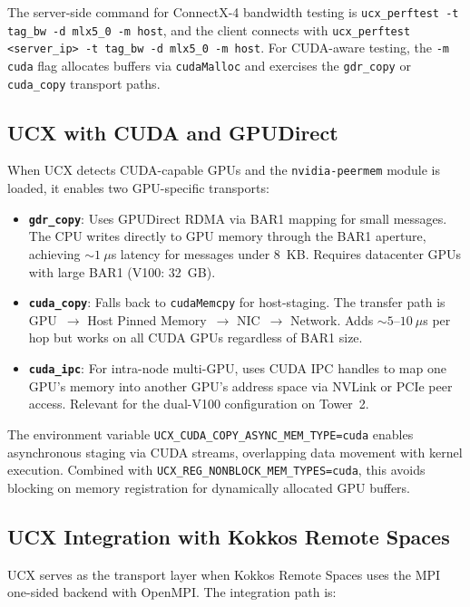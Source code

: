 \documentclass[11pt,letterpaper]{article}
\begin{document}
The server-side command for ConnectX-4 bandwidth testing is \texttt{ucx\_perftest -t tag\_bw -d mlx5\_0 -m host}, and the client connects with \texttt{ucx\_perftest <server\_ip> -t tag\_bw -d mlx5\_0 -m host}. For CUDA-aware testing, the \texttt{-m cuda} flag allocates buffers via \texttt{cudaMalloc} and exercises the \texttt{gdr\_copy} or \texttt{cuda\_copy} transport paths.

\subsection{UCX with CUDA and GPUDirect}

When UCX detects CUDA-capable GPUs and the \texttt{nvidia-peermem} module is loaded, it enables two GPU-specific transports:

\begin{itemize}[noitemsep]
    \item \textbf{\texttt{gdr\_copy}}: Uses GPUDirect RDMA via BAR1 mapping for small messages. The CPU writes directly to GPU memory through the BAR1 aperture, achieving ${\sim}1~\mu$s latency for messages under 8~KB. Requires datacenter GPUs with large BAR1 (V100: 32~GB).
    \item \textbf{\texttt{cuda\_copy}}: Falls back to \texttt{cudaMemcpy} for host-staging. The transfer path is GPU~$\to$ Host Pinned Memory~$\to$ NIC~$\to$ Network. Adds ${\sim}5$--$10~\mu$s per hop but works on all CUDA GPUs regardless of BAR1 size.
    \item \textbf{\texttt{cuda\_ipc}}: For intra-node multi-GPU, uses CUDA IPC handles to map one GPU's memory into another GPU's address space via NVLink or PCIe peer access. Relevant for the dual-V100 configuration on Tower~2.
\end{itemize}

The environment variable \texttt{UCX\_CUDA\_COPY\_ASYNC\_MEM\_TYPE=cuda} enables asynchronous staging via CUDA streams, overlapping data movement with kernel execution. Combined with \texttt{UCX\_REG\_NONBLOCK\_MEM\_TYPES=cuda}, this avoids blocking on memory registration for dynamically allocated GPU buffers.

\subsection{UCX Integration with Kokkos Remote Spaces}

UCX serves as the transport layer when Kokkos Remote Spaces uses the MPI one-sided backend with OpenMPI. The integration path is:
\end{document}

